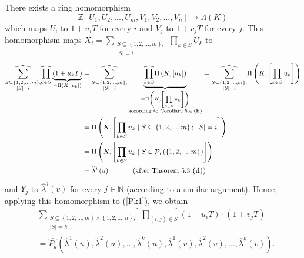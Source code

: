 \documentclass[numbers=enddot,12pt,final,onecolumn,notitlepage]{scrartcl}%
\begin{document}
There exists a ring homomorphism%
\[
\mathbb{Z}\left[  U_{1},U_{2},...,U_{m},V_{1},V_{2},...,V_{n}\right]
\rightarrow\Lambda\left(  K\right)
\]
which maps $U_{i}$ to $1+u_{i}T$ for every $i$ and $V_{j}$ to $1+v_{j}T$ for
every $j$. This homomorphism maps $X_{i}=\sum\limits_{\substack{S\subseteq
\left\{  1,2,...,m\right\}  ;\\\left\vert S\right\vert =i}}\prod\limits_{k\in
S}U_{k}$ to%
\begin{align*}
\widehat{\sum\limits_{\substack{S\subseteq\left\{  1,2,...,m\right\}
;\\\left\vert S\right\vert =i}}}\widehat{\prod\limits_{k\in S}}%
\underbrace{\left(  1+u_{k}T\right)  }_{=\Pi\left(  K,\left[  u_{k}\right]
\right)  }  &  =\widehat{\sum\limits_{\substack{S\subseteq\left\{
1,2,...,m\right\}  ;\\\left\vert S\right\vert =i}}}\underbrace{\widehat{\prod
\limits_{k\in S}}\Pi\left(  K,\left[  u_{k}\right]  \right)  }_{\substack{=\Pi
\left(  K,\left[  \prod\limits_{k\in S}u_{k}\right]  \right)
\\\text{according to Corollary 5.4 \textbf{(b)}}}}=\widehat{\sum
\limits_{\substack{S\subseteq\left\{  1,2,...,m\right\}  ;\\\left\vert
S\right\vert =i}}}\Pi\left(  K,\left[  \prod\limits_{k\in S}u_{k}\right]
\right) \\
&  =\Pi\left(  K,\left[  \prod\limits_{k\in S}u_{k}\mid S\subseteq\left\{
1,2,...,m\right\}  ;\ \left\vert S\right\vert =i\right]  \right) \\
&  =\Pi\left(  K,\left[  \prod\limits_{k\in S}u_{k}\mid S\in\mathcal{P}%
_{i}\left(  \left\{  1,2,...,m\right\}  \right)  \right]  \right) \\
&  =\widehat{\lambda}^{i}\left(  u\right)  \ \ \ \ \ \ \ \ \ \ \left(
\text{after Theorem 5.3 \textbf{(d)}}\right)
\end{align*}
and $Y_{j}$ to $\widehat{\lambda}^{j}\left(  v\right)  $ for every
$j\in\mathbb{N}$ (according to a similar argument). Hence, applying this
homomorphism to (\ref{Pk1}), we obtain%
\begin{align*}
&  \widehat{\sum_{\substack{S\subseteq\left\{  1,2,...,m\right\}
\times\left\{  1,2,...,n\right\}  ;\\\left\vert S\right\vert =k}%
}}\widehat{\prod_{\left(  i,j\right)  \in S}}\left(  1+u_{i}T\right)
\widehat{\cdot}\left(  1+v_{j}T\right) \\
&  =\widehat{P_{k}}\left(  \widehat{\lambda}^{1}\left(  u\right)
,\widehat{\lambda}^{2}\left(  u\right)  ,...,\widehat{\lambda}^{k}\left(
u\right)  ,\widehat{\lambda}^{1}\left(  v\right)  ,\widehat{\lambda}%
^{2}\left(  v\right)  ,...,\widehat{\lambda}^{k}\left(  v\right)  \right)  .
\end{align*}
\end{document}
